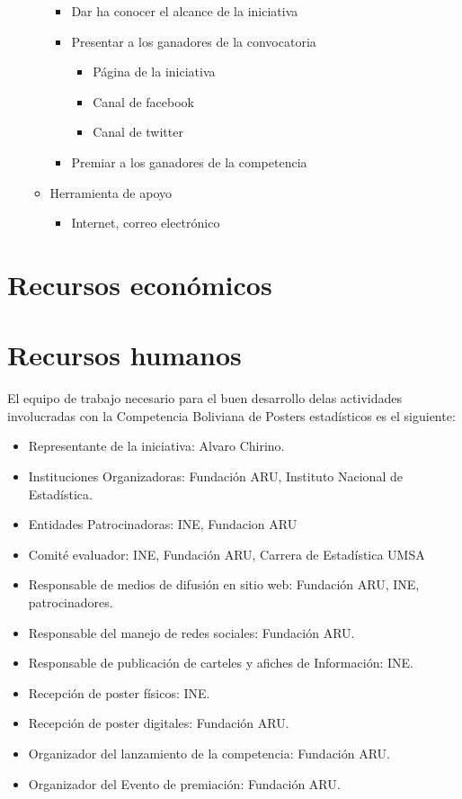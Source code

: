 \documentclass{article}
\begin{document}
\begin{enumerate}
\begin{itemize}
\begin{itemize}
\item Dar ha conocer el alcance de la iniciativa
\item Presentar a los ganadores de la convocatoria
\begin{itemize}
\item Página de la iniciativa 
\item Canal de facebook
\item Canal de twitter
\end{itemize}
\item Premiar a los ganadores de la competencia
\end{itemize}
\item Herramienta de apoyo
\begin{itemize}
\item Internet, correo electrónico
\end{itemize}
\end{itemize}
\end{enumerate}


\section{Recursos económicos}

\section{Recursos humanos}

El equipo de trabajo necesario para el buen desarrollo delas actividades involucradas con la Competencia Boliviana de Posters estadísticos es el siguiente: \\

\begin{itemize}
\item Representante de la iniciativa: Alvaro Chirino.  
\item Instituciones Organizadoras: Fundación ARU, Instituto Nacional de Estadística.
\item Entidades Patrocinadoras: INE, Fundacion ARU
\item Comité evaluador: INE, Fundación ARU, Carrera de Estadística UMSA
\item Responsable de medios de difusión en sitio web:  Fundación ARU, INE, patrocinadores. 
\item Responsable del manejo de redes sociales: Fundación ARU.
\item Responsable de publicación de carteles y afiches de Información: INE.
\item Recepción de poster físicos: INE.
\item Recepción de poster digitales: Fundación ARU.
\item Organizador del lanzamiento de la competencia: Fundación ARU.
\item Organizador del Evento de premiación: Fundación ARU.

\end{itemize}
\end{document}
